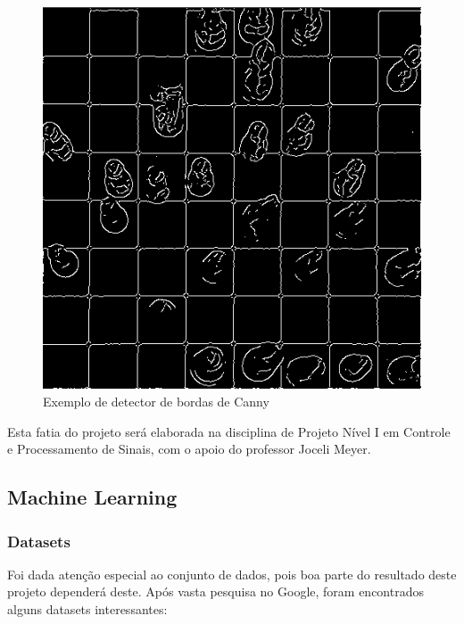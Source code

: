 \documentclass[a4paper,12pt,twoside]{article}
\begin{document}
\begin{figure}[h!]
\centering
  \includegraphics[width=\linewidth]{fig/detector.png}
\caption{Exemplo de detector de bordas de Canny}
\label{fig:detector}
\end{figure}

Esta fatia do projeto será elaborada na disciplina de Projeto Nível I em Controle e Processamento de Sinais,
com o apoio do professor Joceli Meyer.

\subsection{Machine Learning}

\subsubsection{Datasets}

Foi dada atenção especial ao conjunto de dados,
pois boa parte do resultado deste projeto dependerá deste.
Após vasta pesquisa no Google, foram encontrados alguns datasets interessantes:
\end{document}

